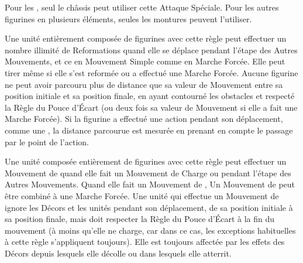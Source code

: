 
Pour les \chariots{}, seul le châssis peut utiliser cette Attaque Spéciale. Pour les autres figurines en plusieurs éléments, seules les montures peuvent l'utiliser.


Une unité entièrement composée de figurines avec cette règle peut effectuer un nombre illimité de Reformations quand elle se déplace pendant l'étape des Autres Mouvements, et ce en Mouvement Simple comme en Marche Forcée. Elle peut tirer même si elle s'est reformée ou a effectué une Marche Forcée. Aucune figurine ne peut avoir parcouru plus de distance que sa valeur de Mouvement entre sa position initiale et sa position finale, en ayant contourné les obstacles et respecté la Règle du Pouce d'Écart (ou deux fois sa valeur de Mouvement si elle a fait une Marche Forcée). Si la figurine a effectué une action pendant son déplacement, comme une \sweepingattack{}, la distance parcourue est mesurée en prenant en compte le passage par le point de l'action. 


 Une unité composée entièrement de figurines avec cette règle peut effectuer un Mouvement de \fly{} quand elle fait un Mouvement de Charge ou pendant l'étape des Autres Mouvements. Quand elle fait un Mouvement de \fly{},  Un Mouvement de \fly{} peut être combiné à une Marche Forcée. Une unité qui effectue un Mouvement de \fly{} ignore les Décors et les unités pendant son déplacement, de sa position initiale à sa position finale, mais doit respecter la Règle du Pouce d'Écart à la fin du mouvement (à moins qu'elle ne charge, car dans ce cas, les exceptions habituelles à cette règle s'appliquent toujours). Elle est toujours affectée par les effets des Décors depuis lesquels elle décolle ou dans lesquels elle atterrit.


